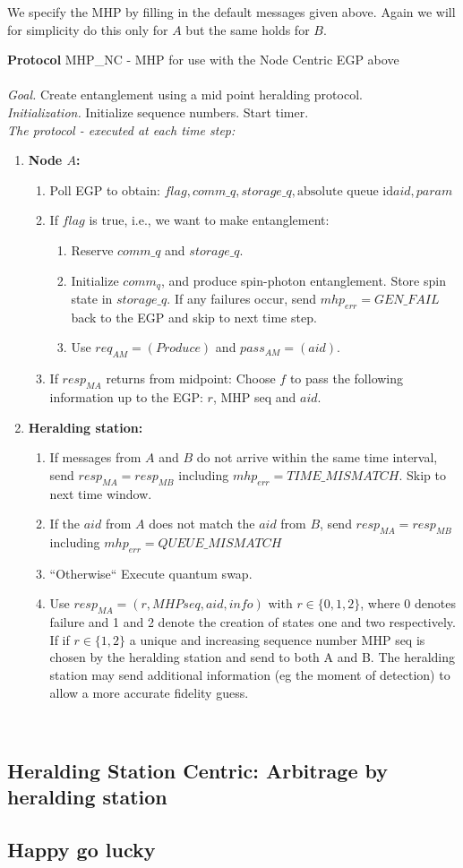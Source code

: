 \documentclass{article}
\makeatletter
\newcounter{Lprotocol}
\newenvironment{Lprotocol}[1]
  {\par\addvspace{\topsep}
   \noindent
   \tabularx{\linewidth}{@{} X @{}}
    \hline
    \refstepcounter{Lprotocol}\textbf{Protocol \theLprotocol} #1 \\
    \hline}
  { \\
    \hline
   \endtabularx
   \par\addvspace{\topsep}}
\newcommand{\sbline}{\\[.5\normalbaselineskip]}%
\makeatother
\begin{document}
We specify the MHP by filling in the default messages given above. Again we will for simplicity do this only for $A$ but the same holds for $B$.
\begin{Lprotocol}{MHP\_NC - MHP for use with the Node Centric EGP above}
\sbline
\textit{Goal.} Create entanglement using a mid point heralding protocol.
\sbline
\textit{Initialization.} Initialize sequence numbers. Start timer.
\sbline
\textit{The protocol - executed at each time step:}
\begin{enumerate}
    \item \textbf{Node $A$:}
	\begin{enumerate}
	  \item Poll EGP to obtain: $flag, comm\_q, storage\_q, \mbox{absolute queue id} aid, param$
	  \item If $flag$ is true, i.e., we want to make entanglement:
      \begin{enumerate}
	    \item Reserve $comm\_q$ and $storage\_q$.
	    \item Initialize $comm_q$, and produce spin-photon entanglement. Store spin state in $storage\_q$. If any failures occur, send $mhp_{err} = GEN\_FAIL$ back to the EGP and skip to next time step.
	    \item Use $req_{AM} = (Produce)$ and $pass_{AM} = (aid)$.
      \end{enumerate}
      \item If $resp_{MA}$ returns from midpoint: Choose $f$ to pass the following information up to the EGP: $r$, MHP seq and $aid$.
	\end{enumerate}
	\item \textbf{Heralding station:}
	\begin{enumerate}
	  \item If messages from $A$ and $B$ do not arrive within the same time interval, send $resp_{MA}=resp_{MB}$ including $mhp_{err} = TIME\_MISMATCH$. Skip to next time window.
	  \item If the $aid$ from $A$ does not match the $aid$ from $B$, send $resp_{MA} = resp_{MB}$ including $mhp_{err} = QUEUE\_MISMATCH$
	  \item ``Otherwise`` Execute quantum swap.
	  \item Use $resp_{MA} = (r, MHP seq, aid, info)$ with $r \in \{0,1,2\}$, where 0 denotes failure and 1 and 2 denote the creation of states one and two respectively. If if $r \in \{1,2\}$ a unique and increasing sequence number MHP seq is chosen by the heralding station and send to both A and B. The heralding station may send additional information (eg the moment of detection) to allow a more accurate fidelity guess.
	\end{enumerate}
  \end{enumerate}
\end{Lprotocol}


\subsection{Heralding Station Centric: Arbitrage by heralding station}

\subsection{Happy go lucky}
\end{document}
